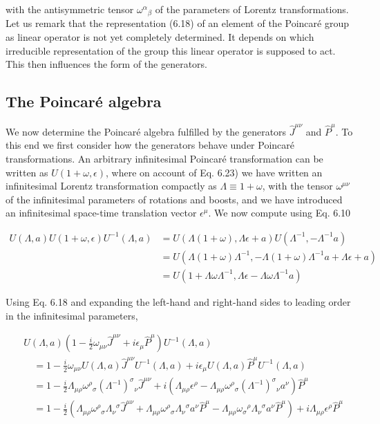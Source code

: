 \documentclass[10pt, letterpaper]{article}
\begin{document}
with the antisymmetric tensor $\omega^{\alpha}{ }_{\beta}$ of the parameters of Lorentz transformations.\\
Let us remark that the representation (6.18) of an element of the Poincaré group as linear operator is not yet completely determined. It depends on which irreducible representation of the group this linear operator is supposed to act. This then influences the form of the generators.

\subsection{The Poincaré algebra}
We now determine the Poincaré algebra fulfilled by the generators $\hat{J}^{\mu \nu}$ and $\hat{P}^{\mu}$. To this end we first consider how the generators behave under Poincaré transformations. An arbitrary infinitesimal Poincaré transformation can be written as $U(1+\omega, \epsilon)$, where on account of Eq. 6.23) we have written an infinitesimal Lorentz transformation compactly as $\Lambda \equiv 1+\omega$, with the tensor $\omega^{\mu \nu}$ of the infinitesimal parameters of rotations and boosts, and we have introduced an infinitesimal space-time translation vector $\epsilon^{\mu}$. We now compute using Eq. 6.10

$$
\begin{aligned}
U(\Lambda, a) U(1+\omega, \epsilon) U^{-1}(\Lambda, a) & =U(\Lambda(1+\omega), \Lambda \epsilon+a) U\left(\Lambda^{-1},-\Lambda^{-1} a\right) \\
& =U\left(\Lambda(1+\omega) \Lambda^{-1},-\Lambda(1+\omega) \Lambda^{-1} a+\Lambda \epsilon+a\right) \\
& =U\left(1+\Lambda \omega \Lambda^{-1}, \Lambda \epsilon-\Lambda \omega \Lambda^{-1} a\right)
\end{aligned}
$$

Using Eq. 6.18 and expanding the left-hand and right-hand sides to leading order in the infinitesimal parameters,

$$
\begin{aligned}
& U(\Lambda, a)\left(1-\frac{i}{2} \omega_{\mu \nu} \hat{J}^{\mu \nu}+i \epsilon_{\mu} \hat{P}^{\mu}\right) U^{-1}(\Lambda, a) \\
& \quad=1-\frac{i}{2} \omega_{\mu \nu} U(\Lambda, a) \hat{J}^{\mu \nu} U^{-1}(\Lambda, a)+i \epsilon_{\mu} U(\Lambda, a) \hat{P}^{\mu} U^{-1}(\Lambda, a) \\
& \quad=1-\frac{i}{2} \Lambda_{\mu \rho} \omega^{\rho}{ }_{\sigma}\left(\Lambda^{-1}\right)^{\sigma}{ }_{\nu} \hat{J}^{\mu \nu}+i\left(\Lambda_{\mu \rho} \epsilon^{\rho}-\Lambda_{\mu \rho} \omega^{\rho}{ }_{\sigma}\left(\Lambda^{-1}\right)^{\sigma}{ }_{\nu} a^{\nu}\right) \hat{P}^{\mu} \\
& \quad=1-\frac{i}{2}\left(\Lambda_{\mu \rho} \omega^{\rho}{ }_{\sigma} \Lambda_{\nu}{ }^{\sigma} \hat{J}^{\mu \nu}+\Lambda_{\mu \rho} \omega^{\rho}{ }_{\sigma} \Lambda_{\nu}{ }^{\sigma} a^{\nu} \hat{P}^{\mu}-\Lambda_{\mu \rho} \omega_{\sigma}{ }^{\rho} \Lambda_{\nu}{ }^{\sigma} a^{\nu} \hat{P}^{\mu}\right)+i \Lambda_{\mu \rho} \epsilon^{\rho} \hat{P}^{\mu}
\end{aligned}
$$
\end{document}
